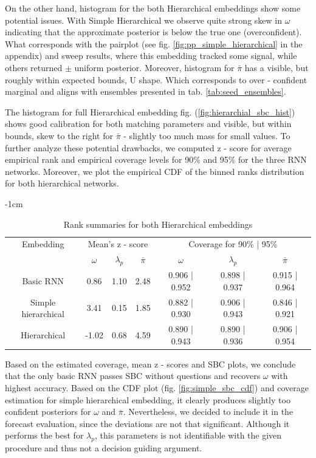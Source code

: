 \documentclass[12pt]{article}
\begin{document}
On the other hand, histogram for the both Hierarchical embeddings show some potential issues. With Simple Hierarchical we observe quite strong skew in $\omega$ indicating that the approximate posterior is below the true one (overconfident). What corresponds with the pairplot (see fig. \ref{fig:pp_simple_hierarchical} in the appendix) and sweep results, where this embedding tracked some signal, while others returned $\pm$ uniform posterior. Moreover, histogram for $\bar{\pi}$ has a visible, but roughly within expected bounds, U shape. Which corresponds to over - confident marginal and aligns with ensembles presented in tab. \ref{tab:seed_ensembles}. 

The histogram for full Hierarchical embedding fig. (\ref{fig:hierarchial_sbc_hist}) shows good calibration for both matching parameters and visible, but within bounds, skew to the right for $\bar{\pi}$ - slightly too much mass for small values. To further analyze these potential drawbacks, we computed z - score for average empirical rank and empirical coverage levels for 90\% and 95\% for the three RNN networks. Moreover, we plot the empirical CDF of the binned ranks distribution for both hierarchical networks.

\setlength{\tabcolsep}{12pt}
\begin{table}[ht]
    \centering
    \addtolength{\leftskip} {-1cm} %
    \addtolength{\rightskip}{-1cm}
    \begin{tabular}[width=\textwidth]{|c|c c c|c c c|}
        \hline
         Embedding  & \multicolumn{3}{|c|}{Mean's z - score} & \multicolumn{3}{|c|}{Coverage for 90\% | 95\%}\\
         & $\omega$ & $\lambda_p$ & $\bar{\pi}$ & $\omega$ & $\lambda_p$ & $\bar{\pi}$ \\ 
         \hline
         Basic RNN & 0.86 & 1.10 & 2.48 & 0.906 | 0.952 & 0.898 | 0.937 & 0.915 | 0.964  \\
         Simple hierarchical & 3.41 & 0.15 & 1.85 & 0.882 | 0.930 & 0.906 | 0.943 & 0.846 | 0.921 \\
         Hierarchical & -1.02 & 0.68 & 4.59 & 0.890 | 0.943 & 0.890 | 0.936 & 0.906 | 0.954 \\
         \hline \hline
    \end{tabular}
    \caption{Rank summaries for both Hierarchical embeddings}
    \label{tab:rank_summaries_hierarchicals}
\end{table}

Based on the estimated coverage, mean z - scores and SBC plots, we conclude that the only basic RNN passes SBC without questions and recovers $\omega$ with highest accuracy. Based on the CDF plot (fig. \ref{fig:simple_sbc_cdf}) and coverage estimation for simple hierarchical embedding, it clearly produces slightly too confident posteriors for $\omega$ and $\bar{\pi}$. Nevertheless, we decided to include it in the forecast evaluation, since the deviations are not that significant. Although it performs the best for $\lambda_p$, this parameters is not identifiable with the given procedure and thus not a decision guiding argument.
\end{document}
